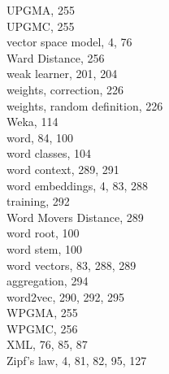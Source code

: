 \documentclass[10pt]{book}
\begin{document}
UPGMA, 255\\
UPGMC, 255\\
vector space model, 4, 76\\
Ward Distance, 256\\
weak learner, 201, 204\\
weights, correction, 226\\
weights, random definition, 226\\
Weka, 114\\
word, 84, 100\\
word classes, 104\\
word context, 289, 291\\
word embeddings, 4, 83, 288\\
training, 292\\
Word Movers Distance, 289\\
word root, 100\\
word stem, 100\\
word vectors, 83, 288, 289\\
aggregation, 294\\
word2vec, 290, 292, 295\\
WPGMA, 255\\
WPGMC, 256\\
XML, 76, 85, 87\\
Zipf's law, 4, 81, 82, 95, 127
\end{document}
